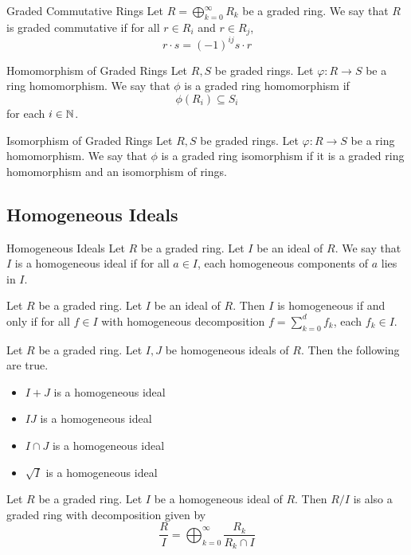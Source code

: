 \documentclass[a4paper]{article}
\begin{document}
\begin{defn}{Graded Commutative Rings}{} Let $R=\bigoplus_{k=0}^\infty R_k$ be a graded ring. We say that $R$ is graded commutative if for all $r\in R_i$ and $r\in R_j$, $$r\cdot s=(-1)^{ij}s\cdot r$$
\end{defn}

\begin{defn}{Homomorphism of Graded Rings}{} Let $R,S$ be graded rings. Let $\varphi:R\to S$ be a ring homomorphism. We say that $\phi$ is a graded ring homomorphism if $$\phi(R_i)\subseteq S_i$$ for each $i\in\mathbb{N}$. 
\end{defn}

\begin{defn}{Isomorphism of Graded Rings}{} Let $R,S$ be graded rings. Let $\varphi:R\to S$ be a ring homomorphism. We say that $\phi$ is a graded ring isomorphism if it is a graded ring homomorphism and an isomorphism of rings. 
\end{defn}

\subsection{Homogeneous Ideals}
\begin{defn}{Homogeneous Ideals}{} Let $R$ be a graded ring. Let $I$ be an ideal of $R$. We say that $I$ is a homogeneous ideal if for all $a\in I$, each homogeneous components of $a$ lies in $I$. 
\end{defn}

\begin{lmm}{}{} Let $R$ be a graded ring. Let $I$ be an ideal of $R$. Then $I$ is homogeneous if and only if for all $f\in I$ with homogeneous decomposition $f=\sum_{k=0}^df_k$, each $f_k\in I$. 
\end{lmm}

\begin{lmm}{}{} Let $R$ be a graded ring. Let $I,J$ be homogeneous ideals of $R$. Then the following are true. 
\begin{itemize}
\item $I+J$ is a homogeneous ideal
\item $IJ$ is a homogeneous ideal
\item $I\cap J$ is a homogeneous ideal
\item $\sqrt{I}$ is a homogeneous ideal
\end{itemize}
\end{lmm}

\begin{prp}{}{} Let $R$ be a graded ring. Let $I$ be a homogeneous ideal of $R$. Then $R/I$ is also a graded ring with decomposition given by $$\frac{R}{I}=\bigoplus_{k=0}^\infty\frac{R_k}{R_k\cap I}$$
\end{prp}
\end{document}
